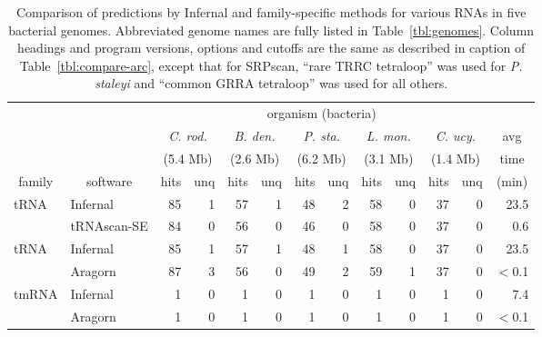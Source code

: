 \begin{table}
\caption{Comparison of predictions by Infernal and family-specific
  methods for various RNAs in five bacterial genomes. Abbreviated
  genome names are fully listed in Table~\ref{tbl:genomes}.  
  Column headings and program versions, options and cutoffs are the
  same as described in caption of Table~\ref{tbl:compare-arc}, except
  that for SRPscan, ``rare TRRC tetraloop'' was used for \emph{P. staleyi}
  and ``common GRRA tetraloop'' was used for all others.  
}
\begin{center}
\begin{tabular}{|l|l|rr|rr|rr|rr|rr|r|}
\multicolumn{1}{c}{} & \multicolumn{1}{c}{} &  \multicolumn{10}{c}{organism (bacteria)}   & \multicolumn{1}{c}{} \\ \cline{3-12}
\multicolumn{1}{c}{}  &  \multicolumn{1}{c|}{}  &  \multicolumn{2}{c|}{\emph{C. rod.}}  &  \multicolumn{2}{c|}{\emph{B. den.}}  &  \multicolumn{2}{c|}{\emph{P. sta.}}  &  \multicolumn{2}{c|}{\emph{L. mon.}}  &  \multicolumn{2}{c|}{\emph{C. ucy.}}   & \multicolumn{1}{c}{avg} \\ 
\multicolumn{1}{c}{}  &  \multicolumn{1}{c|}{}  &  \multicolumn{2}{c|}{(5.4 Mb)}  &  \multicolumn{2}{c|}{(2.6 Mb)}  &  \multicolumn{2}{c|}{(6.2 Mb)}  &  \multicolumn{2}{c|}{(3.1 Mb)}  &  \multicolumn{2}{c|}{(1.4 Mb)} & \multicolumn{1}{c}{time}  \\ 
\multicolumn{1}{c}{family}  &  \multicolumn{1}{c|}{software}  &  hits & unq &  hits & unq &  hits & unq &  hits & unq &  hits & unq  & \multicolumn{1}{c}{(min)} \\ \hline 
tRNA             &  Infernal         &   85 &   1 &   57 &   1 &   48 &   2 &   58 &   0 &   37 &   0 &    23.5  \\ 
                 &  tRNAscan-SE      &   84 &   0 &   56 &   0 &   46 &   0 &   58 &   0 &   37 &   0 &     0.6  \\ \hline 
tRNA             &  Infernal         &   85 &   1 &   57 &   1 &   48 &   1 &   58 &   0 &   37 &   0 &    23.5  \\ 
                 &  Aragorn          &   87 &   3 &   56 &   0 &   49 &   2 &   59 &   1 &   37 &   0 &  $<$0.1  \\ \hline 
tmRNA            &  Infernal         &    1 &   0 &    1 &   0 &    1 &   0 &    1 &   0 &    1 &   0 &     7.4  \\ 
                 &  Aragorn          &    1 &   0 &    1 &   0 &    1 &   0 &    1 &   0 &    1 &   0 &  $<$0.1  \\ \hline 

\end{tabular}
\end{center}
\end{table}
